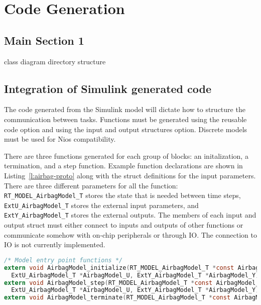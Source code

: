 
\chapter{Code Generation} %

\label{c:code-gen} %


\section{Main Section 1}

class diagram
directory structure



\section{Integration of Simulink generated code}

The code generated from the Simulink model will dictate how to structure the communication between tasks. Functions must be generated using the reusable code option and using the input and output structures option. Discrete models must be used for Nios compatibility.

There are three functions generated for each group of blocks: an initalization, a termination, and a step function. Example function declarations are shown in Listing~\ref{l:airbag-proto} along with the struct definitions for the input parameters. There are three different parameters for all the function: 
\texttt{RT\_MODEL\_AirbagModel\_T} stores the state that is needed between time steps, \texttt{ExtU\_AirbagModel\_T} stores the external input parameters, and \texttt{ExtY\_AirbagModel\_T} stores the external outputs. The members of each input and output struct must either connect to inputs and outputs of other functions or communicate somehow with on-chip peripherals or through IO. The connection to IO is not currently implemented.

\begin{lstlisting}[caption={Airbag model function declarations},label=l:airbag-proto,language=C]
/* Model entry point functions */
extern void AirbagModel_initialize(RT_MODEL_AirbagModel_T *const AirbagModel_M,
  ExtU_AirbagModel_T *AirbagModel_U, ExtY_AirbagModel_T *AirbagModel_Y);
extern void AirbagModel_step(RT_MODEL_AirbagModel_T *const AirbagModel_M,
  ExtU_AirbagModel_T *AirbagModel_U, ExtY_AirbagModel_T *AirbagModel_Y);
extern void AirbagModel_terminate(RT_MODEL_AirbagModel_T *const AirbagModel_M);
\end{lstlisting}

